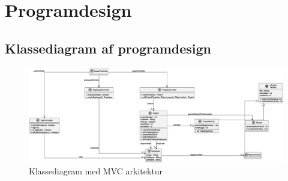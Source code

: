 \section{Programdesign}
\subsection{Klassediagram af programdesign}
\begin{figure}[H]
    \centering
    \caption{Klassediagram med MVC arkitektur}\label{fig:ClassDiagMVC}
    \includegraphics[width = \textwidth]{Diagrams/ClassDiagramMVC.eps}
\end{figure}
